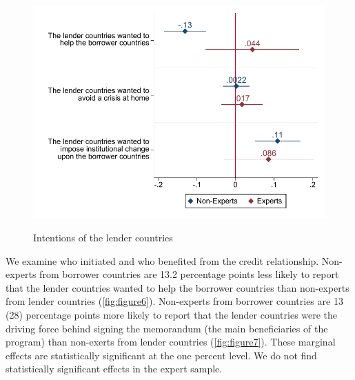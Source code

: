  \begin{figure}[H]
\begin{center}
     \caption{Intentions of the lender countries}
    
     \includegraphics[scale=0.8]{Question2_base.pdf}
     \label{fig:figure6}
      \end{center}
      \tiny
\end{figure}
We examine who initiated and who benefited from the credit relationship. 
Non-experts from borrower countries are 13.2 percentage points less likely to report that the lender countries wanted to help the borrower countries than non-experts from lender countries (\autoref{fig:figure6}). Non-experts from borrower countries are 13 (28) percentage points more likely to report that the lender countries were the driving force behind signing the memorandum (the main beneficiaries of the program) than non-exerts from lender countries (\autoref{fig:figure7}). These marginal effects are statistically significant at the one percent level. We do not find statistically significant effects in the expert sample. \\

